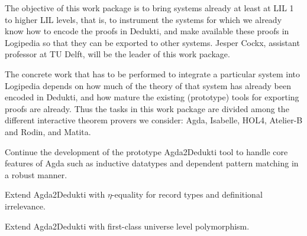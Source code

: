 \begin{workpackage}[id=instrumentation,type=RTD,wphases=1-48,
  short=Integration,%
  title=Integration,
  lead=Del,
  DelRM=14,
  GotRM=4,
  TumRM=5,
  ChaRM=16,
  CleRM=14,
  ImtRM=1,
  TouRM=11,
  BolRM=16, %
  InrRM=6]

\begin{wpobjectives}
  The objective of this work package is to bring systems already at least at
  LIL 1 to higher LIL levels, that is, to instrument the systems
  for which we already know how to encode the proofs in Dedukti, and
  make available these proofs in Logipedia so that
  they can be exported to other systems.
  Jesper Cockx, assistant professor at TU Delft, will be the leader of
  this work package.
\end{wpobjectives}

\begin{wpdescription}
  The concrete work that has to be performed to integrate a particular
  system into Logipedia depends on how much of the theory of that
  system has already been encoded in Dedukti, and how mature the
  existing (prototype) tools for exporting proofs are already. Thus
  the tasks in this work package are divided among the different
  interactive theorem provers we consider: Agda, Isabelle, HOL4,
  Atelier-B and Rodin, and Matita.
\end{wpdescription}

\begin{tasklist}
\begin{task}[id=agda,
  title=Instrument Agda,
  lead=Del,
  DelRM=14,
  GotRM=4,
  wphases=1-18]
% 
\begin{compactitem}
\item Continue the development of the prototype Agda2Dedukti tool to
handle core features of Agda such as inductive datatypes and dependent
pattern matching in a robust manner.
\item Extend Agda2Dedukti with $\eta$-equality for record types and definitional irrelevance.
\item Extend Agda2Dedukti with first-class universe level polymorphism.
\end{compactitem}
\end{task}


\end{tasklist}
\end{workpackage}
